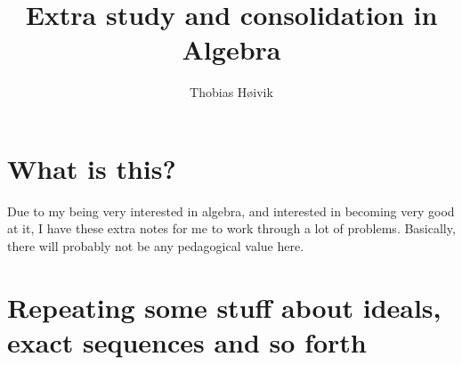 \documentclass[11pt]{article}
\title{\huge{Extra study and consolidation in Algebra}}
\author{\LARGE{Thobias Høivik}}
\date{}
\begin{document}
\maketitle

\tableofcontents

\newpage

\section{What is this?}
Due to my being very interested in algebra, and interested 
in becoming very good at it, I have these extra 
notes for me to work through a lot of 
problems. 
Basically, there will probably not be any pedagogical value here. 

\section{Repeating some stuff about ideals, exact sequences and so forth}
\end{document}
